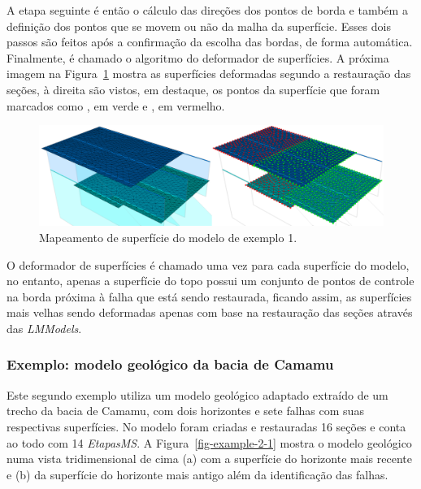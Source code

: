 A etapa seguinte é então o cálculo das direções dos pontos de borda e também a definição dos pontos que se movem ou não da malha da superfície. Esses dois passos são feitos após a confirmação da escolha das bordas, de forma automática. Finalmente, é chamado o algoritmo do deformador de superfícies. A próxima imagem na Figura~\ref{fig-example-1-5} mostra as superfícies deformadas segundo a restauração das seções, à direita são vistos, em destaque, os pontos da superfície que foram marcados como , em verde e , em vermelho.

\begin{figure} [H]
  \begin{center}
    \includegraphics[width=\textwidth]{images/fig-example-1-5}
    \caption{Mapeamento de superfície do modelo de exemplo 1.}\label{fig-example-1-5}
  \end{center}
\end{figure}

O deformador de superfícies é chamado uma vez para cada superfície do modelo, no entanto, apenas a superfície do topo possui um conjunto de pontos de controle na borda próxima à falha que está sendo restaurada, ficando assim, as superfícies mais velhas sendo deformadas apenas com base na restauração das seções através das \textit{LMModels}.

\subsubsection{Exemplo: modelo geológico da bacia de Camamu}

Este segundo exemplo utiliza um modelo geológico adaptado extraído de um trecho da bacia de Camamu\cite{Camamu}, com dois horizontes e sete falhas com suas respectivas superfícies. No modelo foram criadas e restauradas 16 seções e conta ao todo com 14 \textit{EtapasMS}. A Figura~\ref{fig-example-2-1} mostra o modelo geológico numa vista tridimensional de cima (a) com a superfície do horizonte mais recente e (b) da superfície do horizonte mais antigo além da identificação das falhas.

